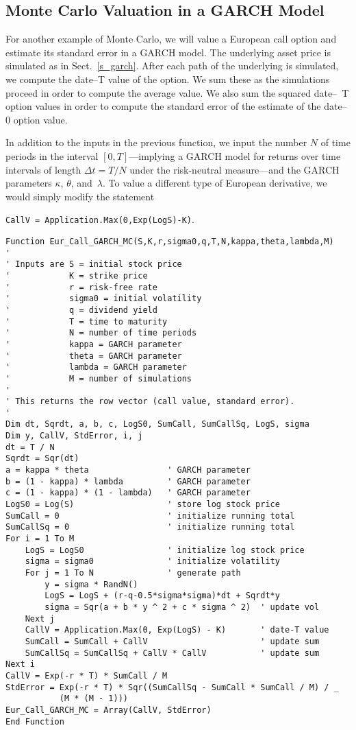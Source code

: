\subsection*{Monte Carlo Valuation in a GARCH Model}

For another example of Monte Carlo, we will value a European call option and estimate its standard error in a GARCH model.  The underlying asset price is simulated as in Sect.~\ref{s_garch}.  After each path of the underlying is simulated, we compute the date--T value of the option.  We sum these as the simulations proceed in order to compute the average value.  We also sum the squared date--~T option values in order to compute the standard error of the estimate of the date--0 option value.

In addition to the inputs in the previous function, we input  the number $N$ of time periods in the interval $[0,T]$---implying a GARCH model for returns over time intervals of length $\varDelta t = T/N$ under the risk-neutral measure---and the GARCH parameters $\kappa$, $\theta$, and~$\lambda$. To value a different type of European derivative, we would simply modify the statement 
\small\begin{center}
\verb!CallV = Application.Max(0,Exp(LogS)-K)!.
 \end{center}\normalsize

\small\begin{verbatim}
Function Eur_Call_GARCH_MC(S,K,r,sigma0,q,T,N,kappa,theta,lambda,M)
'
' Inputs are S = initial stock price
'            K = strike price
'            r = risk-free rate
'            sigma0 = initial volatility
'            q = dividend yield
'            T = time to maturity
'            N = number of time periods
'            kappa = GARCH parameter
'            theta = GARCH parameter
'            lambda = GARCH parameter
'            M = number of simulations
'
' This returns the row vector (call value, standard error).
'
Dim dt, Sqrdt, a, b, c, LogS0, SumCall, SumCallSq, LogS, sigma
Dim y, CallV, StdError, i, j
dt = T / N
Sqrdt = Sqr(dt)
a = kappa * theta                ' GARCH parameter
b = (1 - kappa) * lambda         ' GARCH parameter
c = (1 - kappa) * (1 - lambda)   ' GARCH parameter
LogS0 = Log(S)                   ' store log stock price
SumCall = 0                      ' initialize running total
SumCallSq = 0                    ' initialize running total
For i = 1 To M
    LogS = LogS0                 ' initialize log stock price
    sigma = sigma0               ' initialize volatility
    For j = 1 To N               ' generate path
        y = sigma * RandN()
        LogS = LogS + (r-q-0.5*sigma*sigma)*dt + Sqrdt*y
        sigma = Sqr(a + b * y ^ 2 + c * sigma ^ 2)  ' update vol
    Next j
    CallV = Application.Max(0, Exp(LogS) - K)       ' date-T value
    SumCall = SumCall + CallV                       ' update sum
    SumCallSq = SumCallSq + CallV * CallV           ' update sum
Next i
CallV = Exp(-r * T) * SumCall / M  
StdError = Exp(-r * T) * Sqr((SumCallSq - SumCall * SumCall / M) / _
           (M * (M - 1)))
Eur_Call_GARCH_MC = Array(CallV, StdError)
End Function
\end{verbatim}\normalsize



